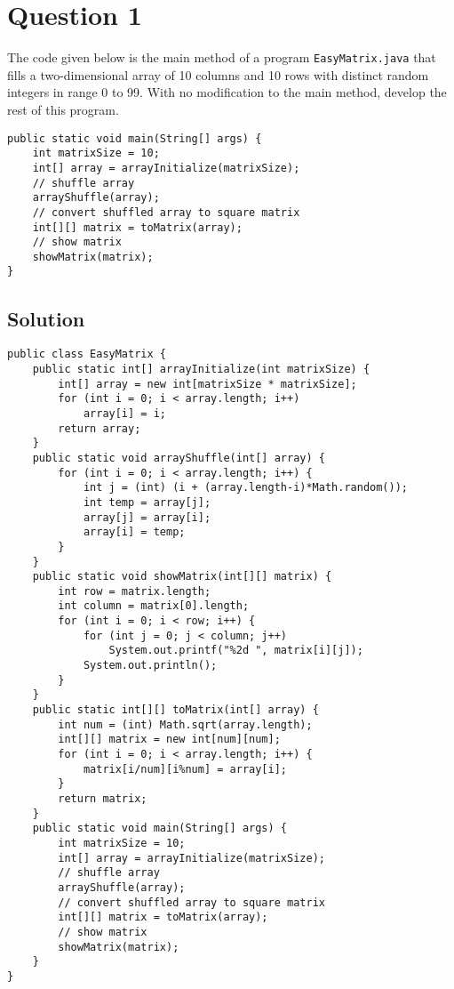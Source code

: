 \documentclass[12pt,letterpaper,twoside]{article}
\begin{document}


\section*{Question 1}

The code given below is the main method of a program \texttt{EasyMatrix.java} that fills a two-dimensional array of 10 columns and 10 rows with distinct random integers in range 0 to 99. With no modification to the main method, develop the rest of this program.

\lstset{language=java}
\begin{lstlisting}
public static void main(String[] args) {
	int matrixSize = 10;
	int[] array = arrayInitialize(matrixSize);
	// shuffle array
	arrayShuffle(array);
	// convert shuffled array to square matrix
	int[][] matrix = toMatrix(array);
	// show matrix
	showMatrix(matrix);
}
\end{lstlisting}

\subsection*{Solution}

\lstset{language=java}
\begin{lstlisting}
public class EasyMatrix {
	public static int[] arrayInitialize(int matrixSize) {
		int[] array = new int[matrixSize * matrixSize];
		for (int i = 0; i < array.length; i++)
			array[i] = i;
		return array;
	}
	public static void arrayShuffle(int[] array) {
		for (int i = 0; i < array.length; i++) {
			int j = (int) (i + (array.length-i)*Math.random());
			int temp = array[j];
			array[j] = array[i];
			array[i] = temp;
		}
	}
	public static void showMatrix(int[][] matrix) {
		int row = matrix.length;
		int column = matrix[0].length;
		for (int i = 0; i < row; i++) {
			for (int j = 0; j < column; j++)
				System.out.printf("%2d ", matrix[i][j]);
			System.out.println();
		}
	}
	public static int[][] toMatrix(int[] array) {
		int num = (int) Math.sqrt(array.length);
		int[][] matrix = new int[num][num];
		for (int i = 0; i < array.length; i++) {
			matrix[i/num][i%num] = array[i];
		}
		return matrix;
	}
	public static void main(String[] args) {
		int matrixSize = 10;
		int[] array = arrayInitialize(matrixSize);
		// shuffle array
		arrayShuffle(array);
		// convert shuffled array to square matrix
		int[][] matrix = toMatrix(array);
		// show matrix
		showMatrix(matrix);
	}
}
\end{lstlisting}
\end{document}

